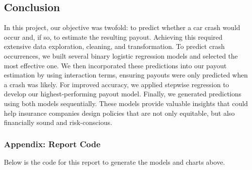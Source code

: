\documentclass[
]{article}
\begin{document}
\subsection{Conclusion}\label{conclusion}

In this project, our objective was twofold: to predict whether a car
crash would occur and, if so, to estimate the resulting payout.
Achieving this required extensive data exploration, cleaning, and
transformation. To predict crash occurrences, we built several binary
logistic regression models and selected the most effective one. We then
incorporated these predictions into our payout estimation by using
interaction terms, ensuring payouts were only predicted when a crash was
likely. For improved accuracy, we applied stepwise regression to develop
our highest-performing payout model. Finally, we generated predictions
using both models sequentially. These models provide valuable insights
that could help insurance companies design policies that are not only
equitable, but also financially sound and risk-conscious.

\subsubsection{Appendix: Report Code}\label{appendix-report-code}

Below is the code for this report to generate the models and charts
above.
\end{document}
